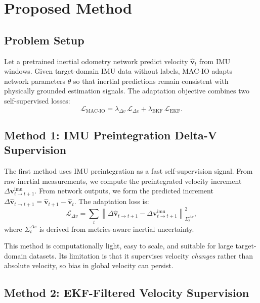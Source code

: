 \section{Proposed Method}
\label{sec:macio:method}

\subsection{Problem Setup}

Let a pretrained inertial odometry network predict velocity $\hat{\mathbf{v}}_t$ from IMU windows.
Given target-domain IMU data without labels, MAC-IO adapts network parameters $\theta$ so that inertial predictions remain consistent with physically grounded estimation signals.
The adaptation objective combines two self-supervised losses:
\begin{equation}
\label{eq:macio:total}
\mathcal{L}_{\text{MAC-IO}} =
\lambda_{\Delta v}\,\mathcal{L}_{\Delta v}
+
\lambda_{\text{EKF}}\,\mathcal{L}_{\text{EKF}}.
\end{equation}

\subsection{Method 1: IMU Preintegration Delta-V Supervision}

The first method uses IMU preintegration as a fast self-supervision signal.
From raw inertial measurements, we compute the preintegrated velocity increment $\Delta\mathbf{v}^{\text{imu}}_{t\rightarrow t+1}$.
From network outputs, we form the predicted increment $\Delta\hat{\mathbf{v}}_{t\rightarrow t+1} = \hat{\mathbf{v}}_{t+1} - \hat{\mathbf{v}}_{t}$.
The adaptation loss is:
\begin{equation}
\label{eq:macio:deltav}
\mathcal{L}_{\Delta v} =
\sum_{t}
\left\|
\Delta\hat{\mathbf{v}}_{t\rightarrow t+1}
-
\Delta\mathbf{v}^{\text{imu}}_{t\rightarrow t+1}
\right\|_{\Sigma^{\Delta v}_{t}}^{2},
\end{equation}
where $\Sigma^{\Delta v}_{t}$ is derived from metrics-aware inertial uncertainty.

This method is computationally light, easy to scale, and suitable for large target-domain datasets.
Its limitation is that it supervises velocity \textit{changes} rather than absolute velocity, so bias in global velocity can persist.

\subsection{Method 2: EKF-Filtered Velocity Supervision}

